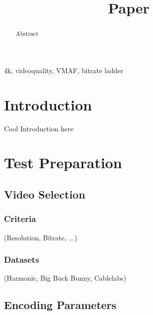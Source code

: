 \documentclass[conference]{IEEEtran}
\begin{document}
\title{Paper}

\author{
\and
{}
\IEEEauthorblockA{}
\and
{}
}

\maketitle

\begin{abstract}
Abstract
\end{abstract}

\begin{IEEEkeywords}
4k, videoquality, VMAF, bitrate ladder
\end{IEEEkeywords}

\section{Introduction}
Cool Introduction here

\section{Test Preparation}
\subsection{Video Selection}
\subsubsection{Criteria}
(Resolution, Bitrate, ...)

\subsubsection{Datasets}
(Harmonic, Big Buck Bunny, Cablelabs)

\subsection{Encoding Parameters}

\end{document}
